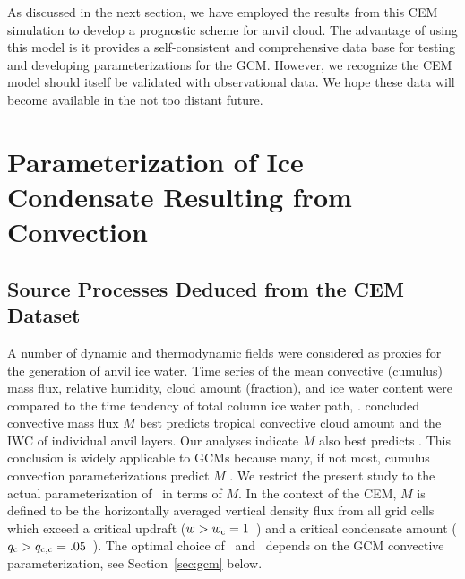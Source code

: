 \documentclass[twoside,agums]{aguplus}
\begin{document}
As discussed in the next section, we have employed the results from 
this CEM simulation to develop a prognostic scheme for anvil cloud. 
The advantage of using this model is it provides a self-consistent and
comprehensive data base for testing and developing  parameterizations
for the GCM.  
However, we recognize the CEM model should itself be validated with
observational data. 
We hope these data will become available in the not too distant future.

\section{Parameterization of Ice Condensate Resulting from Convection}\label{sec:anv}

\subsection{Source Processes Deduced from the CEM Dataset}

A number of dynamic and thermodynamic fields were considered as
proxies for the generation of anvil ice water. 
Time series of the mean convective (cumulus) mass flux, relative
humidity, cloud amount (fraction), and ice water content were
compared to the time tendency of total column ice water path, \IWPdot.
\cite{XuK91} concluded convective mass flux $M$ best predicts
tropical convective cloud amount and the IWC of individual anvil
layers.  
Our analyses indicate $M$ also best predicts \IWPdot.
This conclusion is widely applicable to GCMs because many, if not
most, cumulus convection parameterizations predict $M$
\cite[e.g.,][]{ArS74,Tie93,ZhM952}. 
We restrict the present study to the actual parameterization of
\IWPdot\ in terms of $M$.
In the context of the CEM, $M$ is defined to be the horizontally
averaged vertical density flux from all grid cells which exceed a
critical updraft ($w > \mbox{$w_\mathrm{c}$} = 1$~\mxs) and a critical condensate amount
($\mbox{$q_\mathrm{c}$} > \mbox{$q_\mathrm{c,c}$} = .05$~\gxkg).
The optimal choice of \wc\ and \qcc\ depends on the GCM convective
parameterization, see Section~\ref{sec:gcm} below.
\end{document}
